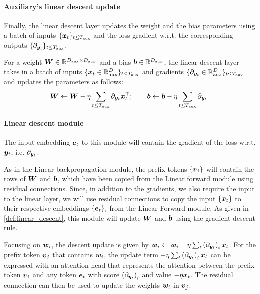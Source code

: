    



\paragraph{Auxiliary's linear descent update} Finally, the linear descent layer updates the weight and the bias parameters using a batch of inputs $\{{\bm{x}}_t\}_{t \le {T_{\text{aux}}}}$ and the loss gradient w.r.t. the corresponding outputs $\{ \partial_{{\bm{y}}_t} \}_{t \le {T_{\text{aux}}}}$.

\begin{definition}\label{def:linear_descent}
    For a weight ${\bm{W}}\in\mathbb{R}^{D_{\text{aux}}\times D_{\text{aux}}}$ and a bias ${\bm{b}} \in \mathbb{R}^{ D_{\text{aux}}}$, the linear descent layer takes in a batch of inputs $\{ {\bm{x}}_t \in \mathbb{R}^ D_{\text{aux}} \}_{t \le {T_{\text{aux}}}}$ and gradients $\{ \partial_{{\bm{y}}_t} \in \mathbb{R}^ D_{\text{aux}} \}_{t \le {T_{\text{aux}}}}$ and updates the parameters as follows:
    \begin{align*}
        {\bm{W}} \gets {\bm{W}} - \eta \sum_{t \le {T_{\text{aux}}}} \partial_{{\bm{y}}_t} {\bm{x}}_t^{\top}; \quad \quad
        {\bm{b}} \gets {\bm{b}} - \eta \sum_{t \le {T_{\text{aux}}}} \partial_{{\bm{y}}_t}.
    \end{align*}
\end{definition}

 


\paragraph{\simulator{} Linear descent module} The input embedding $\ve_t$ to this module will contain the gradient of the loss w.r.t. ${\bm{y}}_t$, i.e. $\partial_{  {\bm{y}}_t }$. 


As in the Linear backpropagation module, the prefix tokens $\{ {\bm{v}}_j \}$ will contain the rows of  ${\bm{W}}$ and ${\bm{b}}$, which have been copied from the Linear forward module using residual connections. Since, in addition to the gradients, we also require the input to the linear layer, we will use residual connections to copy the input $\{ {\bm{x}}_t \}$ to their respective embeddings $\{ \ve_t \},$ from the Linear Forward module. As given in \cref{def:linear_descent}, this module will update ${\bm{W}}$ and ${\bm{b}}$ using the gradient descent rule. 


Focusing on ${\bm{w}}_i$, the descent update is given by ${\bm{w}}_i \gets {\bm{w}}_i - \eta \sum_{t} \left( \partial_{ {\bm{y}}_t } \right)_i {\bm{x}}_t$. For the prefix token ${\bm{v}}_j$ that contains ${\bm{w}}_i$, the update term $- \eta \sum_{t} \left( \partial_{ {\bm{y}}_t } \right)_i {\bm{x}}_t$ can be expressed with an attention head that represents the attention between the prefix token ${\bm{v}}_j$ and any token $\ve_t$ with score $\left( \partial_{ {\bm{y}}_t } \right)_i$ and value $-\eta {\bm{x}}_t$. The residual connection can then be used to update the weights ${\bm{w}}_i$ in ${\bm{v}}_j$. 

